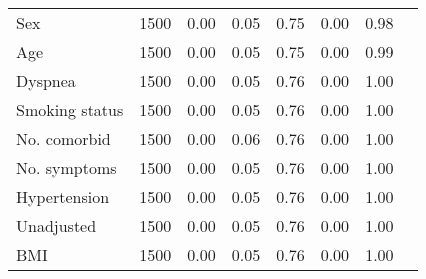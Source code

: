 \documentclass{article}
\begin{document}
{\begin{longtable}{lccccccc}
Sex & 1500 & 0.00 & 0.05 & 0.75 & 0.00 & 0.98 \\ 
Age & 1500 & 0.00 & 0.05 & 0.75 & 0.00 & 0.99 \\ 
Dyspnea & 1500 & 0.00 & 0.05 & 0.76 & 0.00 & 1.00 \\ 
Smoking status & 1500 & 0.00 & 0.05 & 0.76 & 0.00 & 1.00 \\ 
No. comorbid & 1500 & 0.00 & 0.06 & 0.76 & 0.00 & 1.00 \\ 
No. symptoms & 1500 & 0.00 & 0.05 & 0.76 & 0.00 & 1.00 \\ 
Hypertension & 1500 & 0.00 & 0.05 & 0.76 & 0.00 & 1.00 \\ 
Unadjusted & 1500 & 0.00 & 0.05 & 0.76 & 0.00 & 1.00 \\ 
BMI & 1500 & 0.00 & 0.05 & 0.76 & 0.00 & 1.00 \\
\bottomrule
\hline
\end{longtable}
}

\clearpage
\end{document}
